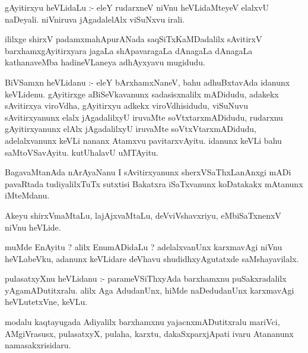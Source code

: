 \documentclass{article}
\begin{document}
\begin{mn}
gAyitirxyu  heVLidaLu :- eleY  rudarxneV  niVnu  heVLidaMteyeV  elalxvU  
naDeyali.  niVniruva  jAgadalelAlx  viSuNxvu  irali.
\end{mn}

\begin{mn}
ililxge  shirxV padamxmahApurANada  saqSiTxKaMDadalilx  sAvitirxV  barxhamxgAyitirxyara  
jagaLa  shApavaragaLa  dAnagaLa  dAnagaLa  kathanaveMba  hadineVLaneya  adhAyxyavu  mugidudu.
\end{mn}




\begin{mn}
BiVSamxn  heVLidanu :- eleY  bArxhamxNaneV,  bahu  adhuBxtavAda  idanunx  keVLidenu.  
gAyitirxge  aBiSeVkavanunx  sadasisxnalilx  mADidudu,  adakekx sAvitirxya  viroVdha,  
gAyitirxyu adkekx viroVdhisidudu,  viSuNuvu  sAvitirxyanunx  elalx  jAgadalilxyU  
iruvaMte  soVtxtarxmADidudu, rudarxnu  gAyitirxyanunx  elAlx  jAgadalilxyU  iruvaMte  
soVtxVtarxmADidudu,  adelalxvanunx  keVLi  nananx  Atamxvu pavitarxvAyitu.  idanunx  
keVLi  bahu  saMtoVSavAyitu.  kutUhalavU  uMTAyitu.
\end{mn}

\begin{mn}
BagavaMtanAda  nArAyaNanu  I sAvitirxyanunx  sherxVSaThxLanAnxgi mADi  pavaRtada  
tudiyalilxTuTx  sutxtisi  Bakatxra  iSaTxvanunx  koDatakakx mAtanunx  iMteMdanu.    
\end{mn}

\begin{mn}
Akeyu  shirxVmaMtaLu,  lajAjxvaMtaLu,  deVviVshavxriyu,  eMbiSaTxnenxV  niVnu  heVLide.
\end{mn}

\begin{mn}
muMde  EnAyitu ?  alilx  EnumADidaLu ?  adelalxvanUnx  karxmavAgi  niVnu  
heVLabeVku,  adanunx  keVLidare  deVhavu  shudidhxyAgutatxde  saMshayavilalx.
\end{mn}

\begin{mn}
pulasatxyXnu  heVLidanu :- parameVSiThxyAda  barxhamxnu  puSakxradalilx  yAgamADutitxralu.  
alilx  Aga  AdudanUnx,  hiMde  naDedudanUnx  karxmavAgi  heVLutetxVne,  keVLu.
\end{mn}

\begin{mn}
modalu  kaqtayugada  Adiyalilx  barxhamxnu  yajacnxmADutitxralu  mariVci,  AMgiVrasusx,  
pulasatxyX,  pulaha,  karxtu,  dakaSxparxjApati  ivaru  Atananunx  namasakxrisidaru.
\end{mn}
\end{document}

